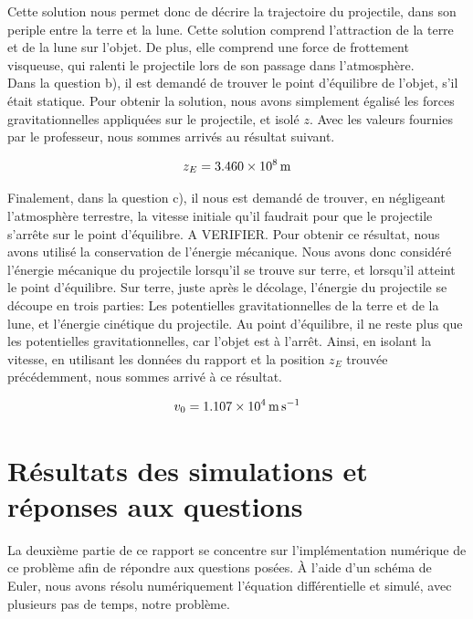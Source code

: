 \documentclass[a4paper,12pt,twoside]{article}
\begin{document}
Cette solution nous permet donc de décrire la trajectoire du projectile, dans son periple entre la terre et la lune. Cette solution comprend l'attraction de la terre et de la lune sur l'objet. De plus, elle comprend une force de frottement visqueuse, qui ralenti le projectile lors de son passage dans l'atmosphère.\\
\newline
Dans la question b), il est demandé de trouver le point d'équilibre de l'objet, s'il était statique. Pour obtenir la solution, nous avons simplement égalisé les forces gravitationnelles appliquées sur le projectile, et isolé $z$. Avec les valeurs fournies par le professeur, nous sommes arrivés au résultat suivant.

\begin{equation}
    z_E = \SI{3.460d8}{\meter}
    \label{val:zE}
\end{equation}

Finalement, dans la question c), il nous est demandé de trouver, en négligeant l'atmosphère terrestre, la vitesse initiale qu'il faudrait pour que le projectile s'arrête sur le point d'équilibre. A VERIFIER. Pour obtenir ce résultat, nous avons utilisé la conservation de l'énergie mécanique. Nous avons donc considéré l'énergie mécanique du projectile lorsqu'il se trouve sur terre, et lorsqu'il atteint le point d'équilibre. Sur terre, juste après le décolage, l'énergie du projectile se découpe en trois parties: Les potentielles gravitationnelles de la terre et de la lune, et l'énergie cinétique du projectile. Au point d'équilibre, il ne reste plus que les potentielles gravitationnelles, car l'objet est à l'arrêt. Ainsi, en isolant la vitesse, en utilisant les données du rapport et la position $z_E$ trouvée précédemment, nous sommes arrivé à ce résultat.

\begin{equation}
    v_0 = \SI{1.107d4}{\meter\per\second}
    \label{val:v0}
\end{equation}


\section{Résultats des simulations et réponses aux questions}
La deuxième partie de ce rapport se concentre sur l'implémentation numérique de ce problème afin de répondre aux questions posées. À l'aide d'un schéma de Euler, nous avons résolu numériquement l'équation différentielle et simulé, avec plusieurs pas de temps, notre problème.
\end{document}
